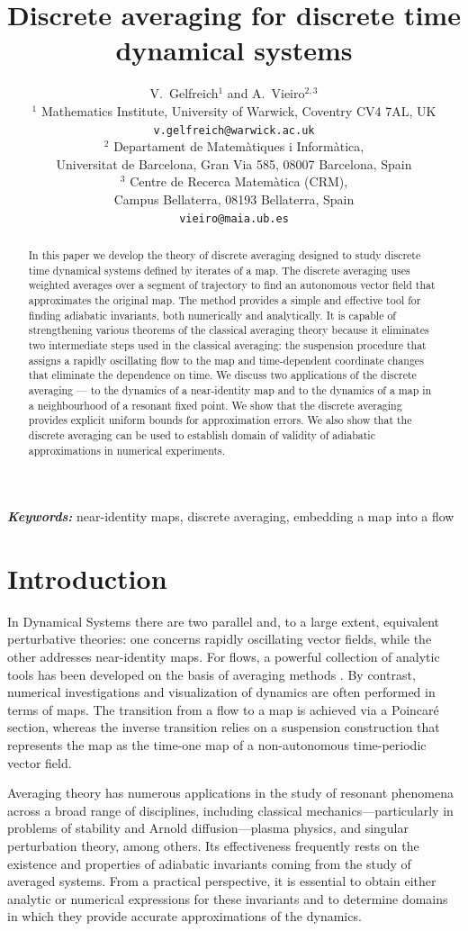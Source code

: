 \documentclass[a4paper,12pt]{article}
\title{Discrete averaging for discrete time dynamical systems}
\author{V.~Gelfreich$^1$ and A.~Vieiro$^{2,3}$\\[4pt]
$^1$ \small Mathematics Institute, University of Warwick, \small Coventry CV4 7AL, UK\\
\small{\tt v.gelfreich@warwick.ac.uk}\\[4pt]
$^2$ \small Departament de Matem\`atiques i Inform\`atica,\\ \small Universitat de Barcelona, Gran Via 585, 08007 Barcelona, Spain\\
$^3$ \small Centre de Recerca Matem\`atica (CRM),\\ \small Campus Bellaterra, 08193 Bellaterra, Spain\\
\small{\tt vieiro@maia.ub.es}
}
\providecommand{\keywords}[1]
{
  \small	
  \textbf{\textit{Keywords:}} #1
}
\begin{document}
\maketitle	
\begin{abstract}
 In this paper we develop the theory of discrete averaging  designed to study discrete time dynamical systems defined by iterates of a map. The discrete averaging uses weighted averages over a segment of trajectory to find an autonomous vector field that approximates the original map. 
The method provides a simple and effective tool for finding adiabatic invariants, both numerically and analytically.
It is capable of strengthening  various theorems of the classical averaging theory because it eliminates two intermediate steps used in the classical averaging: the suspension procedure that assigns a rapidly oscillating flow to the map and time-dependent coordinate changes that eliminate the dependence on time.  
We  discuss  two applications of the discrete averaging --- to  the dynamics of a near-identity map and to the dynamics of a map in a neighbourhood of a resonant fixed point.
We show that the discrete averaging provides explicit uniform   bounds
for approximation errors. We also show that the discrete averaging
can be used to establish domain of validity of adiabatic approximations
in numerical experiments.
\end{abstract}


\keywords{near-identity maps, discrete averaging, embedding a map into a flow}

\section{Introduction}

In Dynamical Systems there are two parallel and, to a large extent, equivalent perturbative theories: one concerns rapidly oscillating vector fields, while the other addresses near-identity maps. For flows, a powerful collection of analytic tools has been developed on the basis of averaging methods \cite{BM1961,Verhulst2023,Verhulst2026,SVM2007}. By contrast, numerical investigations and visualization of dynamics are often performed  in terms of maps. The transition from a flow to a map is achieved via a Poincaré section, whereas the inverse transition relies on a suspension construction that represents the map as the time-one map of a non-autonomous time-periodic vector field.

Averaging theory has numerous applications in the study of resonant phenomena across a broad range of disciplines, including classical mechanics—particularly in problems of stability and Arnold diffusion—plasma physics, and singular perturbation theory, among others. Its effectiveness frequently rests on the existence and properties of adiabatic invariants coming from the study of averaged systems. From a practical perspective, it is essential to obtain either analytic or numerical expressions for these invariants and to determine domains in which they provide accurate approximations of the dynamics.
\end{document}
